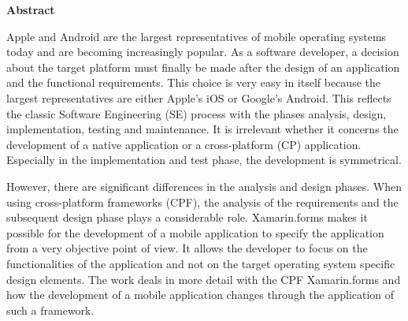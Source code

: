 \begin{center}
{\Large\bfseries Abstract}
\end{center}

Apple and Android are the largest representatives of mobile operating systems today and are becoming increasingly popular. As a software developer, a decision about the target platform must finally be made after the design of an application and the functional requirements. This choice is very easy in itself because the largest representatives are either Apple's iOS or Google's Android. This reflects the classic Software Engineering (SE) process with the phases analysis, design, implementation, testing and maintenance. It is irrelevant whether it concerns the development of a native application or a cross-platform (CP) application. Especially in the implementation and test phase, the development is symmetrical.

However, there are significant differences in the analysis and design phases. When using cross-platform frameworks (CPF), the analysis of the requirements and the subsequent design phase plays a considerable role. Xamarin.forms makes it possible for the development of a mobile application to specify the application from a very objective point of view. It allows the developer to focus on the functionalities of the application and not on the target operating system specific design elements. The work deals in more detail with the CPF Xamarin.forms and how the development of a mobile application changes through the application of such a framework.

